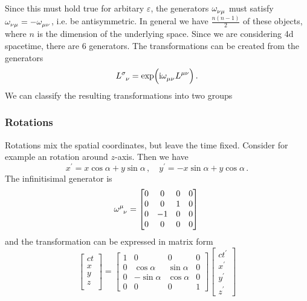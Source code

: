 Since this must hold true for arbitary $\varepsilon$, the generators
$\tensor{\omega}{_\nu_\mu}$ must satisfy
$\tensor{\omega}{_\nu_\mu}=-\tensor{\omega}{_\mu_\nu}$, i.e. be antisymmetric.
In general we have $\frac{n(n-1)}{2}$ of these objects, where $n$ is the
dimension of the underlying space.
Since we are considering 4d spacetime, there are $6$ generators. 
The transformations can be created from the generators
\begin{equation}
\tensor{L}{^\sigma_\nu}=\exp\left(\imI\tensor{\omega}{_\mu_\nu}\tensor{L}{^\mu^\nu}\right)\,.
\end{equation}
We can
classify the resulting transformations into two groups
\subsubsection{Rotations}
Rotations mix the spatial coordinates, but leave the time fixed. Consider for
example an rotation around $z$-axis. Then we have
\begin{equation}
x^\prime=x\cos\alpha+y\sin\alpha \, ,\quad y^\prime=-x\sin\alpha+y\cos\alpha \,
.
\end{equation}
The infinitisimal generator is 
\begin{equation}
 \tensor{\omega}{^\mu_\nu}
  =\begin{bmatrix}
  0&0 & 0&0\\
  0&0 &1&0\\
  0&-1&0 &0\\
  0&0 &0 &0
  \end{bmatrix}\, 
\end{equation}
and the transformation can be expressed in matrix form
\begin{equation}
  \begin{bmatrix}
  ct\\
  x\\
  y\\
  z\\
  \end{bmatrix}=
  \begin{bmatrix}
  1&0 & 0&0\\
  0&\cos\alpha &\sin\alpha&0\\
  0&-\sin\alpha&\cos\alpha &0\\
  0&0 &0 &1
  \end{bmatrix}
  \begin{bmatrix}
  ct^\prime\\
  x^\prime\\
  y^\prime\\
  z^\prime
  \end{bmatrix}
\end{equation}
